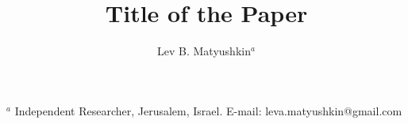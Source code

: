 \documentclass[twoside,twocolumn]{article}
\begin{document}
\title{\large\textbf{Title of the Paper}}

\author{Lev B. Matyushkin$^{a}$}

\date{}
\maketitle

\begin{flushleft}
$^a$ Independent Researcher, Jerusalem, Israel.
E-mail: leva.matyushkin@gmail.com
\end{flushleft}





\end{document}
